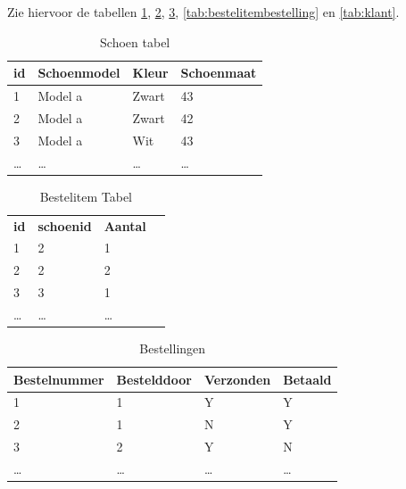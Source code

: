 \documentclass{article}
\begin{document}
Zie hiervoor de tabellen \ref{tab:schoen}, \ref{tab:bestelitem},
\ref{tab:bestellingen}, \ref{tab:bestelitembestelling} en \ref{tab:klant}.

\begin{table}[hp]
  \centering
  \begin{tabular}{l|l|l|l}
    \textbf{id} & \textbf{Schoenmodel} & \textbf{Kleur} & \textbf{Schoenmaat} \\
    \hline
    1 & Model a              & Zwart          & 43 \\
    2 & Model a              & Zwart          & 42 \\
    3 & Model a              & Wit            & 43 \\
    \ldots & \ldots          & \ldots         & \ldots \\
  \end{tabular}
  \caption{Schoen tabel}
  \label{tab:schoen}
\end{table}

\begin{table}[hp]
  \centering
  \begin{tabular}{l|l|l|l}
    \textbf{id} & \textbf{schoenid} & \textbf{Aantal} \\
    1           & 2                 & 1               \\
    2           & 2                 & 2               \\
    3           & 3                 & 1               \\
    \ldots      & \ldots            & \ldots          \\
  \end{tabular}
  \caption{Bestelitem Tabel}
  \label{tab:bestelitem}
\end{table}

\begin{table}[hp]
  \centering
  \begin{tabular}{l|l|l|l}
    \textbf{Bestelnummer} & \textbf{Bestelddoor} & \textbf{Verzonden} 
    & \textbf{Betaald} \\
    \hline
    1 & 1                &  Y & Y \\
    2 & 1                &  N & Y \\
    3 & 2                & Y  & N \\
    \ldots & \ldots & \ldots & \ldots \\
  \end{tabular}
  \caption{Bestellingen}
  \label{tab:bestellingen}
\end{table}
\end{document}
